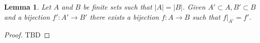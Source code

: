 \documentclass[a4paper]{memoir}
\newtheorem{lemma}{Lemma}
\begin{document}
    \begin{lemma}\label{lem:finite_bijections} 
        Let $A$ and $B$ be finite sets such that $|A| = |B|$. Given $A' \subset A, B' \subset B$ and a bijection $f': A' \to B'$ there exists a bijection $f:A \to B$ such that $f|_{A'} = f'$. 
    \end{lemma}
    \begin{proof}
        TBD
    \end{proof}
    \printbibliography
\end{document}
